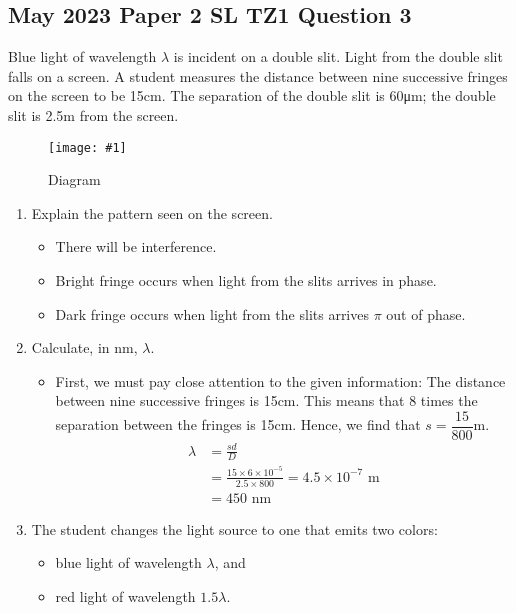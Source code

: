 \documentclass[a4paper,12pt]{article}
\let\oldsi\si
\renewcommand{\si}[1]{\oldsi[per-mode=reciprocal-positive-first]{#1}}
\newcommand{\img}[4]{\begin{center}
  \begin{figure}[H]
    \centering
    \texttt{[image: \#1]}
    \caption{#3}
    \label{fig:#4}
  \end{figure}
\end{center}}
\begin{document}
\pagebreak

\subsection{May 2023 Paper 2 SL TZ1 Question 3}

Blue light of wavelength $\lambda$ is incident on a double slit. Light from the double slit falls on a
screen. A student measures the distance between nine successive fringes on the screen
to be 15cm. The separation of the double slit is 60\si{\micro\m}; the double slit is 2.5m from the screen.
\img{ex/3.png}{0.7}{Diagram}{ex3}
\begin{enumerate}[label=(\alph*)]
  \item Explain the pattern seen on the screen.
        \begin{itemize}
          \item There will be interference.
          \item Bright fringe occurs when light from the slits arrives in phase.
          \item Dark fringe occurs when light from the slits arrives $\pi$ out of phase.
        \end{itemize}
  \item Calculate, in nm, $\lambda$.
        \begin{itemize}
          \item First, we must pay close attention to the given information: The distance between nine successive fringes is 15cm. This means that 8 times the separation between the fringes is 15cm. Hence, we find that $s = \dfrac{15}{800}$m.
                \begin{align*}
                  \lambda & = \frac{sd}{D}                                   \\
                          & = \frac{15\times6\times 10^{-5}}{2.5 \times 800}
                  = 4.5 \times 10^{-7} \text{ m}                             \\
                          & = 450 \text{ nm}
                \end{align*}
        \end{itemize}
  \item The student changes the light source to one that emits two colors:
        \begin{itemize}
          \item blue light of wavelength $\lambda$, and
          \item red light of wavelength $1.5\lambda$.

\end{itemize}
\end{enumerate}
\end{document}
